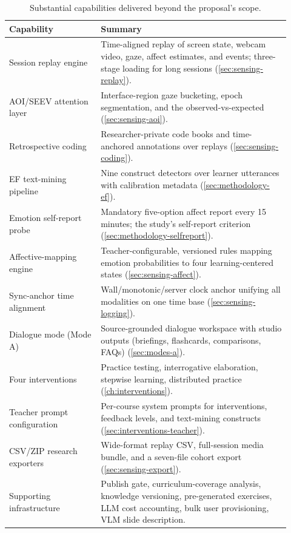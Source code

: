 \begin{table}[htbp]
\centering
\small
\caption{Substantial capabilities delivered beyond the proposal's scope.}
\label{tab:scope-new}
\begin{tabular}{@{}p{0.3\linewidth}p{0.62\linewidth}@{}}
\toprule
Capability & Summary \\
\midrule
Session replay engine & Time-aligned replay of screen state, webcam
video, gaze, affect estimates, and events; three-stage loading for long
sessions (\cref{sec:sensing-replay}). \\
AOI/SEEV attention layer & Interface-region gaze bucketing, epoch
segmentation, and the observed-vs-expected \allocscore{}
(\cref{sec:sensing-aoi}). \\
Retrospective coding & Researcher-private code books and time-anchored
annotations over replays (\cref{sec:sensing-coding}). \\
EF text-mining pipeline & Nine construct detectors over learner
utterances with calibration metadata (\cref{sec:methodology-ef}). \\
Emotion self-report probe & Mandatory five-option affect report every 15
minutes; the study's self-report criterion
(\cref{sec:methodology-selfreport}). \\
Affective-mapping engine & Teacher-configurable, versioned rules mapping
emotion probabilities to four learning-centered states
(\cref{sec:sensing-affect}). \\
Sync-anchor time alignment & Wall/monotonic/server clock anchor unifying
all modalities on one time base (\cref{sec:sensing-logging}). \\
Dialogue mode (Mode A) & Source-grounded dialogue workspace with studio
outputs (briefings, flashcards, comparisons, FAQs)
(\cref{sec:modes-a}). \\
Four interventions & Practice testing, interrogative elaboration,
stepwise learning, distributed practice (\cref{ch:interventions}). \\
Teacher prompt configuration & Per-course system prompts for
interventions, feedback levels, and text-mining constructs
(\cref{sec:interventions-teacher}). \\
CSV/ZIP research exporters & Wide-format replay CSV, full-session media
bundle, and a seven-file cohort export (\cref{sec:sensing-export}). \\
Supporting infrastructure & Publish gate, curriculum-coverage analysis,
knowledge versioning, pre-generated exercises, LLM cost accounting,
bulk user provisioning, VLM slide description. \\
\bottomrule
\end{tabular}
\end{table}

